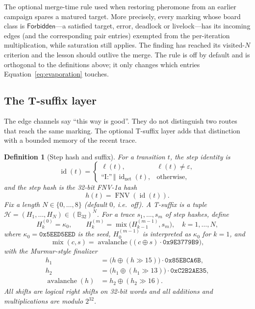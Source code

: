 \documentclass[11pt,a4paper]{article}
\newtheorem{definition}{Definition}[section]
\newcommand{\mix}{\operatorname{mix}}
\newcommand{\FNV}{\operatorname{FNV}}
\newcommand{\TS}{\mathcal{H}}
\newcommand{\B}{\mathbb{B}_{32}}
\begin{document}
The optional merge-time rule used when restoring pheromone from an earlier
campaign spares a matured target.  More precisely, every marking whose board
class is $\mathsf{Forbidden}$---a satisfied target, error, deadlock or
livelock---has its incoming edges (and the corresponding pair entries)
exempted from the per-iteration multiplication, while saturation still
applies.  The finding has reached its visited-$N$ criterion and the lesson
should outlive the merge.  The rule is off by default and is
orthogonal to the definitions above; it only changes which entries
Equation~\eqref{eq:evaporation} touches.

\subsection{The T-suffix layer}\label{sec:tsuffix}

The edge channels say ``this way is good''.  They do not distinguish two
routes that reach the same marking.  The optional T-suffix layer adds that
distinction with a bounded memory of the recent trace.

\begin{definition}[Step hash and suffix]\label{def:tsuffix}
For a transition $t$, the \emph{step identity} is
\[
  \operatorname{id}(t)=
  \begin{cases}
    \ell(t), & \ell(t)\neq\varepsilon,\\
    \text{``I:''}\,\Vert\,\operatorname{id}_{\mathrm{net}}(t), & \text{otherwise},
  \end{cases}
\]
and the \emph{step hash} is the 32-bit FNV-1a hash
\[
  h(t)=\FNV(\operatorname{id}(t)).
\]
Fix a length $N\in\{0,\dots,8\}$ (default $0$, i.e.\ off).  A \emph{T-suffix}
is a tuple $\TS=(H_1,\dots,H_N)\in(\B)^{N}$.  For a trace
$s_1,\dots,s_m$ of step hashes, define
\[
  H_k^{(0)}=\kappa_0,
  \qquad
  H_k^{(m)}=\mix\bigl(H_{k-1}^{(m-1)},s_m\bigr),
  \quad k=1,\dots,N,
  \label{eq:tsuffix}
\]
where $\kappa_0=\mathtt{0x5EED5EED}$ is the seed, $H_0^{(m-1)}$ is interpreted
as $\kappa_0$ for $k=1$, and
\[
  \mix(c,s)=
  \operatorname{avalanche}\bigl((c\oplus s)\cdot\mathtt{0x9E3779B9}\bigr),
\]
with the Murmur-style finalizer
\[
  \begin{aligned}
    h_1 &= \bigl(h\oplus(h\gg15)\bigr)\cdot\mathtt{0x85EBCA6B},\\
    h_2 &= \bigl(h_1\oplus(h_1\gg13)\bigr)\cdot\mathtt{0xC2B2AE35},\\
    \operatorname{avalanche}(h) &= h_2\oplus(h_2\gg16).
  \end{aligned}
\]
All shifts are logical right shifts on 32-bit words and all additions and
multiplications are modulo $2^{32}$.
\end{definition}
\end{document}
